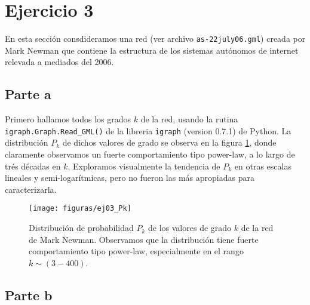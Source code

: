 \section{Ejercicio 3}

En esta secci\'on consdideramos una red (ver archivo \texttt{as-22july06.gml}) creada por Mark Newman que contiene la estructura de los sistemas aut\'onomos de internet relevada a mediados del 2006.


\subsection{Parte a}

Primero hallamos todos los grados $k$ de la red, usando la rutina \texttt{igraph.Graph.Read\_GML()} de la libreria \texttt{igraph} (version 0.7.1) de Python.
La distribuci\'on $P_k$ de dichos valores de grado se observa en la figura \ref{fig:ej03_1}, donde claramente observamos un fuerte comportamiento tipo power-law, a lo largo de tr\'es d\'ecadas en $k$.
Exploramos visualmente la tendencia de $P_k$ en otras escalas lineales y semi-logar\'itmicas, pero no fueron las m\'as apropiadas para caracterizarla.


\begin{figure}
\centering
\texttt{[image: figuras/ej03\_Pk]}
\caption{Distribuci\'on de probabilidad $P_k$ de los valores de grado $k$ de la red de Mark Newman.
Observamos que la distribuci\'on tiene fuerte comportamiento tipo power-law, especialmente en el rango $k \sim (3-400)$.}
\label{fig:ej03_1}
\end{figure}



\subsection{Parte b}
